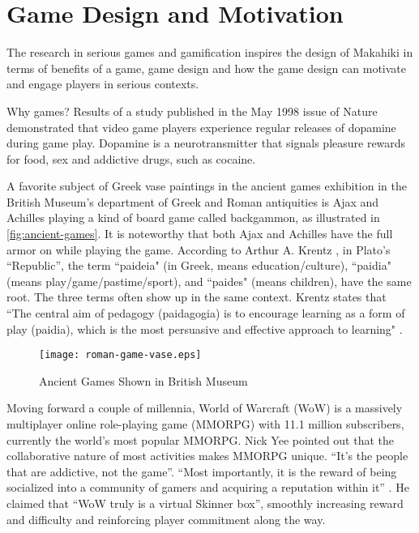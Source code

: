 \section{Game Design and Motivation}
\label{sec:game-design}

The research in serious games and gamification inspires the design of Makahiki in terms of benefits of a game, game design and how the game design can motivate and engage players in serious contexts. 

Why games? Results of a study published in the May 1998 issue of Nature \cite {koepp1998evidence} demonstrated that video game players experience regular releases of dopamine during game play. Dopamine is a neurotransmitter that signals pleasure rewards for food, sex and addictive drugs, such as cocaine. 

A favorite subject of Greek vase paintings in the ancient games exhibition in the British Museum's department of Greek and Roman antiquities is Ajax and Achilles playing a kind of board game called backgammon, as illustrated in \autoref{fig:ancient-games}. It is noteworthy that both Ajax and Achilles have the full armor on while playing the game. According to Arthur A. Krentz \cite{krentz1998play}, in Plato's ``Republic'', the term ``paideia" (in Greek, means education/culture), ``paidia" (means play/game/pastime/sport), and ``paides" (means children), have the same root. The three terms often show up in the same context. Krentz states that ``The central aim of pedagogy (paidagogia) is to encourage learning as a form of play (paidia), which is the most persuasive and effective approach to learning" .

\begin{figure}[ht!]
	\centering
		\texttt{[image: roman-game-vase.eps]}
		\caption{Ancient Games Shown in British Museum}
		\label{fig:ancient-games}
\end{figure}

Moving forward a couple of millennia, World of Warcraft (WoW) is a massively multiplayer online role-playing game (MMORPG) with 11.1 million subscribers, currently the world's most popular MMORPG.  Nick Yee \cite {yee2002understanding} pointed out that the collaborative nature of most activities makes MMORPG unique. ``It's the people that are addictive, not the game''. ``Most importantly, it is the reward of being socialized into a community of gamers and acquiring a reputation within it''  . He claimed \cite {yee2001vsb} that ``WoW truly is a virtual Skinner box'', smoothly increasing reward and difficulty and reinforcing player commitment along the way.
	
